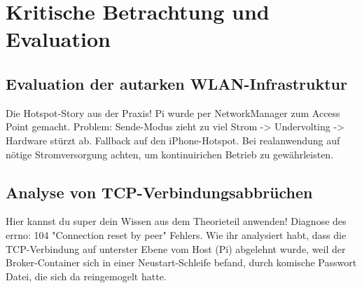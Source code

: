 \chapter{Kritische Betrachtung und Evaluation}

\section{Evaluation der autarken WLAN-Infrastruktur}
Die Hotspot-Story aus der Praxis! Pi wurde per NetworkManager zum Access Point gemacht. Problem: Sende-Modus zieht zu viel Strom -> Undervolting -> Hardware stürzt ab. Fallback auf den iPhone-Hotspot. Bei realanwendung auf nötige Stromversorgung achten, um kontinuirichen Betrieb zu gewährleisten.

\section{Analyse von TCP-Verbindungsabbrüchen}
Hier kannst du super dein Wissen aus dem Theorieteil anwenden! Diagnose des errno: 104 "Connection reset by peer" Fehlers. Wie ihr analysiert habt, dass die TCP-Verbindung auf unterster Ebene vom Host (Pi) abgelehnt wurde, weil der Broker-Container sich in einer Neustart-Schleife befand, durch komische Passwort Datei, die sich da reingemogelt hatte.
